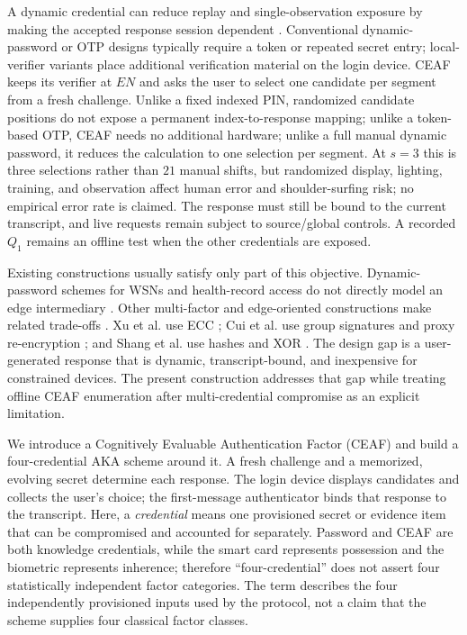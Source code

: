 \documentclass[cmc,article,submit,moreauthors,pdftex]{Definitions/tsp}
\begin{document}
A dynamic credential can reduce replay and single-observation exposure by making the accepted response session dependent \cite{kong}. Conventional dynamic-password or OTP designs typically require a token or repeated secret entry; local-verifier variants place additional verification material on the login device. CEAF keeps its verifier at $EN$ and asks the user to select one candidate per segment from a fresh challenge. Unlike a fixed indexed PIN, randomized candidate positions do not expose a permanent index-to-response mapping; unlike a token-based OTP, CEAF needs no additional hardware; unlike a full manual dynamic password, it reduces the calculation to one selection per segment. At $s=3$ this is three selections rather than $21$ manual shifts, but randomized display, lighting, training, and observation affect human error and shoulder-surfing risk; no empirical error rate is claimed. The response must still be bound to the current transcript, and live requests remain subject to source/global controls. A recorded $Q_1$ remains an offline test when the other credentials are exposed.

Existing constructions usually satisfy only part of this objective. Dynamic-password schemes for WSNs and health-record access do not directly model an edge intermediary \cite{yusuf,chen,turkanovic2013}. Other multi-factor and edge-oriented constructions make related trade-offs \cite{amin,li2018threefactor,li2018ecc}. Xu et al. use ECC \cite{xu}; Cui et al. use group signatures and proxy re-encryption \cite{cui}; and Shang et al. use hashes and XOR \cite{shang}. The design gap is a user-generated response that is dynamic, transcript-bound, and inexpensive for constrained devices. The present construction addresses that gap while treating offline CEAF enumeration after multi-credential compromise as an explicit limitation.

We introduce a Cognitively Evaluable Authentication Factor (CEAF) and build a four-credential AKA scheme around it. A fresh challenge and a memorized, evolving secret determine each response. The login device displays candidates and collects the user's choice; the first-message authenticator binds that response to the transcript. Here, a \emph{credential} means one provisioned secret or evidence item that can be compromised and accounted for separately. Password and CEAF are both knowledge credentials, while the smart card represents possession and the biometric represents inherence; therefore ``four-credential'' does not assert four statistically independent factor categories. The term describes the four independently provisioned inputs used by the protocol, not a claim that the scheme supplies four classical factor classes.
\end{document}
